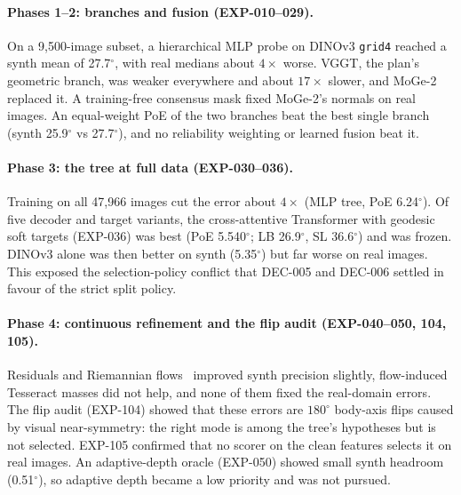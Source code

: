 \paragraph{Phases 1--2: branches and fusion (EXP-010--029).}
On a 9,500-image subset, a hierarchical MLP probe on DINOv3 \texttt{grid4} reached a synth mean of 27.7$^\circ$, with real medians about $4\times$ worse. VGGT, the plan's geometric branch, was weaker everywhere and about $17\times$ slower, and MoGe-2 replaced it. A training-free consensus mask fixed MoGe-2's normals on real images. An equal-weight PoE of the two branches beat the best single branch (synth 25.9$^\circ$ vs 27.7$^\circ$), and no reliability weighting or learned fusion beat it.

\paragraph{Phase 3: the tree at full data (EXP-030--036).}
Training on all 47,966 images cut the error about $4\times$ (MLP tree, PoE 6.24$^\circ$). Of five decoder and target variants, the cross-attentive Transformer with geodesic soft targets (EXP-036) was best (PoE 5.540$^\circ$; LB 26.9$^\circ$, SL 36.6$^\circ$) and was frozen. DINOv3 alone was then better on synth (5.35$^\circ$) but far worse on real images. This exposed the selection-policy conflict that DEC-005 and DEC-006 settled in favour of the strict split policy.

\paragraph{Phase 4: continuous refinement and the flip audit (EXP-040--050, 104, 105).}
Residuals and Riemannian flows~\cite{chen2024rfm} improved synth precision slightly, flow-induced Tesseract masses did not help, and none of them fixed the real-domain errors. The flip audit (EXP-104) showed that these errors are $180^\circ$ body-axis flips caused by visual near-symmetry: the right mode is among the tree's hypotheses but is not selected. EXP-105 confirmed that no scorer on the clean features selects it on real images. An adaptive-depth oracle (EXP-050) showed small synth headroom (0.51$^\circ$), so adaptive depth became a low priority and was not pursued.

